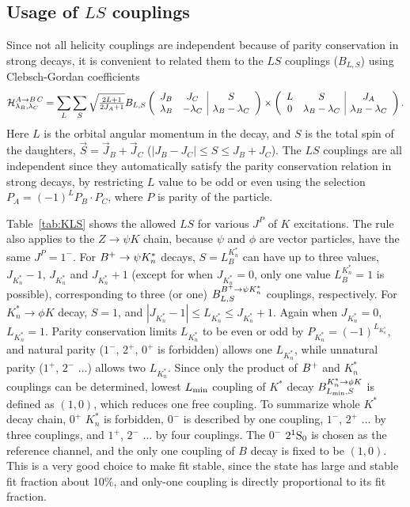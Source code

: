 \subsection{Usage of $LS$ couplings}

Since not all helicity couplings are independent because of parity conservation in strong decays, 
it is convenient to related them to the $LS$ couplings ($B_{L,S}$) using Clebsch-Gordan coefficients
\begin{equation}
\H_{\lambda_B,\lambda_C}^{A\to B\,C}=\sum_{L} \sum_{S} 
\sqrt{ \tfrac{2L+1}{2J_A+1} } B_{L,S} 
\left( 
\begin{array}{cc|c}
 J_{B} & J_{C} & S \\
 \lambda_{B} & -\lambda_{C} & \lambda_{B}-\lambda_{C} 
\end{array}
\right)
\times
\left( 
\begin{array}{cc|c}
 L  & S & J_A \\
 0 & \lambda_{B}-\lambda_{C} & \lambda_{B}-\lambda_{C}   
\end{array}
\right). 
\label{SUPeq:LS}
\end{equation}
Here $L$ is the orbital angular momentum in the decay, and 
$S$ is the total spin of the daughters, $\vec{S}=\vec{J}_B+\vec{J}_C$
($|J_B-J_C|\le S \le J_B+J_C$).
The $LS$ couplings are all independent since they automatically satisfy the parity conservation relation in strong decays, 
by restricting $L$ value to be odd or even using the selection $P_A=(-1)^L P_B \cdot P_C$, where $P$ is parity of the particle.   

Table~\ref{tab:KLS} shows the allowed $LS$ for various $J^P$ of $K$ excitations. 
The rule also applies to the $Z\to\psi K$ chain, 
because $\psi$ and $\phi$ are vector particles, 
have the same $J^P=1^-$.
For $\Bp\to \psi K^*_n$ decays, $S=L_{B}^{K^*_n}$ can have up to three values, 
$J_{K^*_n}-1$, $J_{K^*_n}$ and $J_{K^*_n}+1$ (except for when $J_{K^*_n}=0$, 
only one value $L_{B}^{K^*_n}=1$ is possible), corresponding to three (or one) $B^{\Bp\to \psi K^*_n}_{L,S}$ couplings, respectively. 
For $K^*_n\to \phi K$ decay, $S=1$, and $|J_{K^*_n}-1|\le L_{K^*_n} \le J_{K^*_n}+1$. 
Again when $J_{K^*_n}=0$, $L_{K^*_n}=1$. 
Parity conservation limits $L_{K^*_n}$ to be even or odd by $P_{K^*_n}=(-1)^{L_{K^*_n}}$, 
and natural parity ($1^-$, $2^+$, $0^+$ is forbidden) allows one $L_{K^*_n}$, 
while unnatural parity ($1^+$, $2^-$ ...) allows two $L_{K^*_n}$.  
Since only the product of $\Bp$ and $K^*_n$ couplings can be determined, 
lowest $L_{\rm min}$ coupling of $K^*$ decay $B^{K^*_n\to \phi K}_{L_{\rm min},S}$ is defined as $(1,0)$,
which reduces one free coupling. 
To summarize whole $K^*$ decay chain,  
$0^+$ ${K^*_n}$ is forbidden, 
$0^-$ is described by one coupling, $1^-$, $2^+$ ... by three couplings, and $1^+$, $2^-$ ... by four couplings.  
The $0^-$  $\nslj{2}{1}{S}{0}$ is chosen as the reference channel, 
and the only one coupling of $B$ decay is fixed to be $(1,0)$.  
This is a very good choice to make fit stable, 
since the state has large and stable fit fraction about 10\%, 
and only-one coupling is directly proportional to its fit fraction. 



